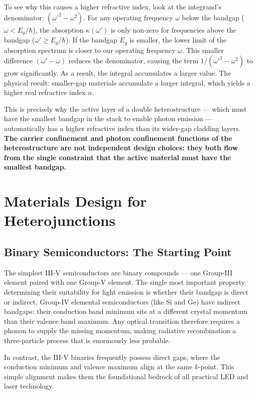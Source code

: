To see why this causes a higher refractive index, look at the integrand's denominator: $(\omega'^2 - \omega^2)$. For any operating frequency $\omega$ below the bandgap ($\omega < E_g/\hbar$), the absorption $\kappa(\omega')$ is only non-zero for frequencies above the bandgap ($\omega' \ge E_g/\hbar$). If the bandgap $E_g$ is smaller, the lower limit of the absorption spectrum is closer to our operating frequency $\omega$. This smaller difference $(\omega' - \omega)$ reduces the denominator, causing the term $1/(\omega'^2 - \omega^2)$ to grow significantly. As a result, the integral accumulates a larger value. The physical result: smaller-gap materials accumulate a larger integral, which yields a higher real refractive index $n$.

This is precisely why the active layer of a double heterostructure — which must have the smallest bandgap in the stack to enable photon emission — automatically has a higher refractive index than its wider-gap cladding layers. \textbf{The carrier confinement and photon confinement functions of the heterostructure are not independent design choices: they both flow from the single constraint that the active material must have the smallest bandgap.}

\section{Materials Design for Heterojunctions}

\subsection{Binary Semiconductors: The Starting Point}

The simplest III-V semiconductors are binary compounds — one Group-III element paired with one Group-V element. The single most important property determining their suitability for light emission is whether their bandgap is direct or indirect. Group-IV elemental semiconductors (like Si and Ge) have indirect bandgaps: their conduction band minimum sits at a different crystal momentum than their valence band maximum. Any optical transition therefore requires a phonon to supply the missing momentum, making radiative recombination a three-particle process that is enormously less probable. 

In contrast, the III-V binaries frequently possess direct gaps, where the conduction minimum and valence maximum align at the same $k$-point. This simple alignment makes them the foundational bedrock of all practical LED and laser technology.


